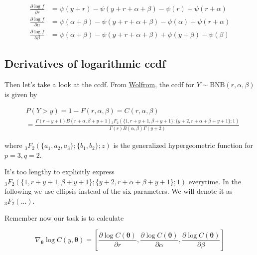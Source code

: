 \documentclass[11pt]{article}
\begin{document}
\begin{equation}
  \begin{aligned}
\frac{\partial \log f}{\partial r} &= \psi(y+r) - \psi(y+r+\alpha+\beta) - \psi(r) + \psi(r+\alpha) \\
\frac{\partial \log f}{\partial \alpha} &= \psi(\alpha+\beta) - \psi(y+r+\alpha+\beta) - \psi(\alpha) + \psi(r+\alpha) \\
\frac{\partial \log f}{\partial \beta} &= \psi(\alpha+\beta) - \psi(y+r+\alpha+\beta) + \psi(y+\beta) - \psi(\beta)
  \end{aligned}
\end{equation}


\subsection*{Derivatives of logarithmic ccdf}
Then let's take a look at the ccdf. From \href{https://reference.wolfram.com/language/ref/BetaNegativeBinomialDistribution.html}{Wolfrom}, the ccdf for $Y\sim \text{BNB}(r,\alpha,\beta)$ is given by

\begin{equation}
\begin{aligned}
& P(Y > y) = 1 - F(r,\alpha,\beta) = C(r,\alpha,\beta) \\
&= \frac{\Gamma (r+y +1) B(r+\alpha ,\beta +y +1) {}_3F_2(\{1,r+y +1,\beta +y +1\}; \{y +2,r+\alpha +\beta +y +1\};1)}{\Gamma (r) B(\alpha ,\beta ) \Gamma (y +2)}
\end{aligned}
\end{equation}

where $_3F_2(\{a_1,a_2,a_3\}; \{b_1,b_2\};z)$ is the generalized hypergeometric function \citep[Ch.~16]{olver2010nist} for $p=3,q=2$. 

It's too lengthy to explicitly express ${}_3F_2(\{1,r+y +1,\beta +y +1\}; \{y +2,r+\alpha +\beta +y +1\};1)$ everytime. In the following we use ellipsis instead of the six parameters. We will denote it as $_3F_2(...)$.


Remember now our task is to calculate

\begin{equation}
	\nabla _{\boldsymbol {\theta}}\log C(y,\boldsymbol\theta) = \left[ \frac{\partial \log C(\boldsymbol {\theta})}{\partial r}, \frac{\partial \log C(\boldsymbol {\theta})}{\partial \alpha}, \frac{\partial \log C(\boldsymbol {\theta})}{\partial \beta} \right]
\end{equation}
\end{document}
